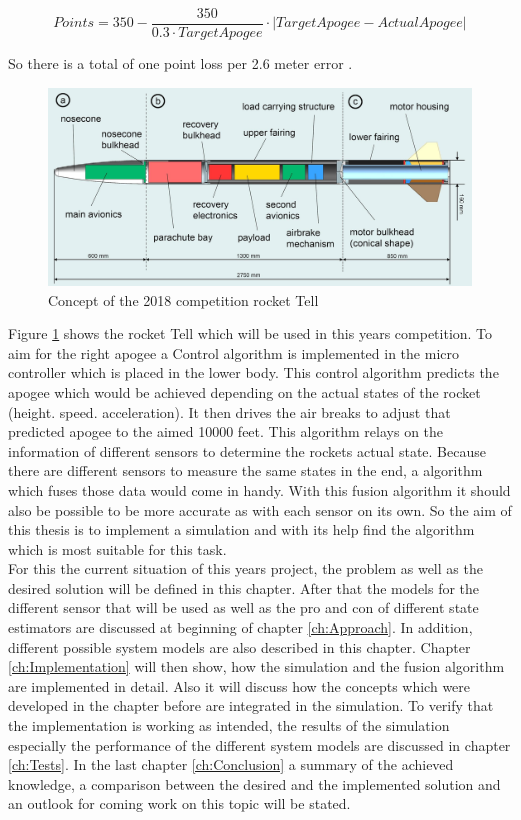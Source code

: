  $$ Points =  350 - \frac{350}{0.3\cdot TargetApogee} \cdot |TargetApogee - ActualApogee|$$
 
 So there is a total of one point loss per 2.6 meter error \cite{SpaceportAmericaCup2018}. \\
 
 \begin{figure}[h]
 \centering
 \includegraphics[width=.8\textwidth]{./Pictures/RocketModel.jpg}
 \caption{Concept of the 2018 competition rocket Tell}
 \label{fig:2018RocketModel}
\end{figure}
 Figure \ref{fig:2018RocketModel} shows the rocket Tell which will be used in this years competition.
 To aim for the right apogee a Control algorithm is implemented in the micro controller which is placed in the lower body.
 This control algorithm predicts the apogee which would be achieved depending on the actual states of the rocket (height. speed. acceleration).
 It then drives the air breaks to adjust that predicted apogee to the aimed 10000 feet.
 This algorithm relays on the information of different sensors to determine the rockets actual state.
 Because there are different sensors to measure the same states in the end, a algorithm which fuses those data would come in handy.
 With this fusion algorithm it should also be possible to be more accurate as with each sensor on its own.
 So the aim of this thesis is to implement a simulation and with its help find the algorithm which is most suitable for this task.\\
 For this the current situation of this years project, the problem as well as the desired solution will be defined in this chapter.
 After that the models for the different sensor that will be used as well as the pro and con of different state estimators are discussed at beginning of chapter \ref{ch:Approach}.
 In addition, different possible system models are also described in this chapter.
 Chapter \ref{ch:Implementation} will then show, how the simulation and the fusion algorithm are implemented in detail.
 Also it will discuss how the concepts which were developed in the chapter before are integrated in the simulation. 
 To verify that the implementation is working as intended, the results of the simulation especially the performance of the different system models are discussed in chapter \ref{ch:Tests}.
 In the last chapter \ref{ch:Conclusion} a summary of the achieved knowledge,  a comparison between the desired and the implemented solution and an outlook for coming work on this topic will be stated.
 \newpage
 

